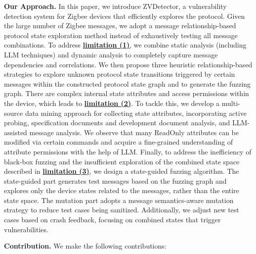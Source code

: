 \documentclass[10pt,journal,compsoc]{IEEEtran}
\begin{document}
\textbf{Our Approach.} In this paper, we introduce ZVDetector, a vulnerability detection system for Zigbee devices that efficiently explores the protocol. Given the large number of Zigbee messages, we adopt a message relationship-based protocol state exploration method instead of exhaustively testing all message combinations. To address \underline{\textbf{limitation (1)}}, we combine static analysis (including LLM techniques) and dynamic analysis to completely capture message dependencies and correlations. We then propose three heuristic relationship-based strategies to explore unknown protocol state transitions triggered by certain messages within the constructed protocol state graph and to generate the fuzzing graph. There are complex internal state attributes and access permissions within the device, which leads to \underline{\textbf{limitation (2)}}. To tackle this, we develop a multi-source data mining approach for collecting state attributes, incorporating active probing, specification documents and development document analysis, and LLM-assisted message analysis. We observe that many ReadOnly attributes can be modified via certain commands and acquire a fine-grained understanding of attribute permissions with the help of LLM. Finally, to address the inefficiency of black-box fuzzing and the insufficient exploration of the combined state space described in \underline{\textbf{limitation (3)}}, we design a state-guided fuzzing algorithm. The state-guided part generates test messages based on the fuzzing graph and explores only the device states related to the messages, rather than the entire state space. The mutation part adopts a message semantics-aware mutation strategy to reduce test cases being sanitized. Additionally, we adjust new test cases based on crash feedback, focusing on combined states that trigger vulnerabilities. \vspace{0.1cm}

\textbf{Contribution.} We make the following contributions:
\end{document}
